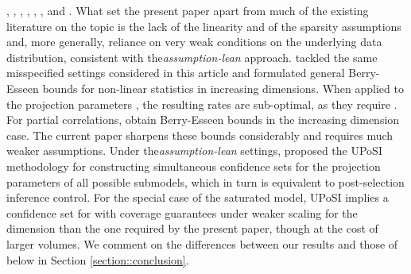 \documentclass{article}
\begin{document}
\cite{javanmard2014confidence}, \cite{javanmard2018}, \cite{ning2017},
\cite{zhu2018,doi:10.1080/01621459.2017.1356319}, \cite{cai2017confidence}, \cite{ren2015}, \cite{rajen.peter.2018} and \cite{peter.sarah.2015}.
What set the present paper apart from much of the existing
literature on the topic is the lack of the linearity and of the sparsity assumptions and, more generally, reliance on very weak conditions on the underlying data distribution, consistent with the{\it assumption-lean} approach.
\cite{boot} tackled the same misspecified settings considered in this article and formulated general Berry-Esseen bounds for non-linear statistics
in increasing dimensions.
When applied to the projection parameters  ,
the resulting rates are sub-optimal, as they require
 .
For partial correlations,
\cite{wasserman2014berry}
obtain Berry-Esseen bounds in the increasing dimension case.
The current paper sharpens these bounds considerably and requires much weaker assumptions.
Under the{\it assumption-lean} settings, \cite{kuchibhotla2018valid} proposed the UPoSI methodology for constructing simultaneous confidence sets for the projection parameters of all possible submodels, which in turn is equivalent to post-selection inference control. For the special case of the saturated model, UPoSI implies a confidence set for   with coverage guarantees under weaker scaling for the dimension than the one required by the present paper, though at the cost of larger volumes. We comment on the differences between our results and those of
\cite{kuchibhotla2018valid} below in Section \ref{section::conclusion}.
\end{document}
